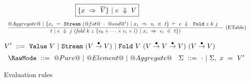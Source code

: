 \begin{figure*}
$$
\boxed{\{x~\Rightarrow~\overline{V}\}~|~e~\Downarrow~V}
$$
$$
\enskip \frac {\displaystyle 
  @Aggregate@~|~\{x_i~=~\texttt{Stream}~(@fst@~\cdot~@snd@^i)~|~x_i~\Rightarrow~\mathit{v}_i~\in~t\}~\vdash~e~\Downarrow~~\texttt{Fold}~z~k~j
  \quad
} {\displaystyle 
  t~|~e~\Downarrow~
  j~(\mathit{fold}~k~z~\{v_0 \times \cdots \times v_i \times ()~|~x_i~\Rightarrow~v_i~\in~t\})
} \  \mbox{(ETable)} \enskip
$$

$$
V'~     ::=~\VValue{V}
        ~|~\VStream {(V \stackrel{\bullet}{\to} V)}
        ~|~\VFold{V}{(V \stackrel{\bullet}{\to} V \stackrel{\bullet}{\to} V)}
                    {(V \stackrel{\bullet}{\to} V)}
$$
$$
\begin{array}{ll}

\RawMode~::=~@Pure@~|~@Element@~|~@Aggregate@

&

\Sigma~::=~\cdot~|~\Sigma,~x~=~V'

\end{array}
$$


\caption{Evaluation rules}
\label{icicle:fig:source:eval}
\end{figure*}


